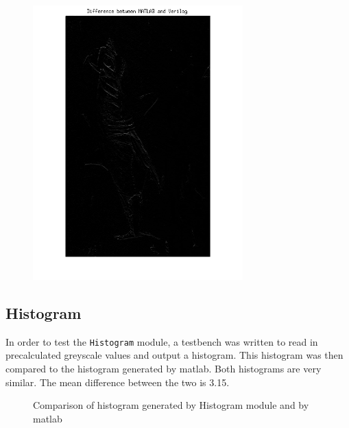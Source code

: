 \documentclass[12pt]{article}
\begin{document}
\begin{figure}[H]
  \centering
  \includegraphics[height=300pt, angle=-90]{Images/RGB2GRAY/Difference.png}
\end{figure}

    
  \newpage
  \subsection{Histogram}
  In order to test the \texttt{Histogram} module, a testbench was written to read in precalculated greyscale values and output a histogram. This histogram was then compared to the histogram generated by matlab. Both histograms are very similar. The mean difference between the two is 3.15.
  \begin{figure}[H]
    \caption{Comparison of histogram generated by Histogram module and by matlab}
    \label{fig:histogram_testbench}
  \end{figure} 
  
\end{document}
